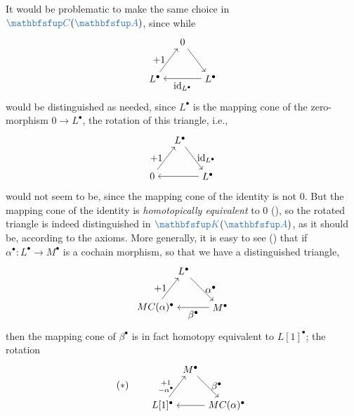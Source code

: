 It would be problematic to make the same choice in
$\categ{C}(\categ{A})$, since while
\[
  \begin{tikzpicture}[baseline=(current bounding box.center)]
    \node (T) at (1,1.3) {$0$}; \node (Z) at (0,0)
    {$L^\bullet$}; \node (B) at (2,0)
    {$L^\bullet$}; \draw[->] (T) -- (B); \draw[->] (B) -- (Z)
    node[midway, below]
    {$\id_{L^\bullet}$}; \draw[->] (Z) -- (T) node[midway, left]
    {$+1$};
  \end{tikzpicture}
\]
would be distinguished as needed, since $L^\bullet$ is the mapping
cone of the zero-morphism $0 \to L^\bullet$, the rotation of this
triangle, i.e.,
\[
  \begin{tikzpicture}[baseline=(current bounding box.center)]
    \node (L) at (1,1.3) {$L^\bullet$}; \node (Z) at (0,0)
    {$0$}; \node (B) at (2,0)
    {$L^\bullet$}; \draw[->] (L) -- (B) node[midway, right]
    {$\id_{L^\bullet}$}; \draw[->] (B) -- (Z); \draw[->] (Z) -- (L)
    node[midway, left] {$+1$};
  \end{tikzpicture}
\]
would not seem to be, since the mapping cone of the identity is not
$0$. But the mapping cone of the identity is \emph{homotopically
  equivalent} to $0$
(),
so the rotated triangle is indeed distinguished in
$\categ{K}(\categ{A})$, as it should be, according to the axioms. More
generally, it is easy to see
()
that if $\alpha^\bullet : L^\bullet \to M^\bullet$ is a cochain
morphism, so that we have a distinguished triangle,
\[
  \begin{tikzpicture}[baseline=(current bounding box.center)]
    \node (L) at (1,1.3)
    {$L^\bullet$}; \node (MC) at (0,0)
    {$MC(\alpha)^\bullet$}; \node (M) at (2.3,0)
    {$M^\bullet$}; \draw[->] (L) -- (M) node[midway, right]
    {$\alpha^\bullet$}; \draw[->] (M) -- (MC) node[midway, below]
    {$\beta^\bullet$}; \draw[->] (MC) -- (L) node[midway, left]
    {$+1$};
  \end{tikzpicture}
\]
then the mapping cone of $\beta^\bullet$ is in fact homotopy
equivalent to $L[1]^\bullet$; the rotation
\[
  (*) \qquad
  \begin{tikzpicture}[baseline=(current bounding box.center)]
    \node (M) at (1,1.3)
    {$M^\bullet$}; \node (L1) at (0,0)
    {$L[1]^\bullet$}; \node (MC) at (2.3,0)
    {$MC(\alpha)^\bullet$}; \draw[->] (M) -- (MC) node[midway, right]
    {$\beta^\bullet$}; \draw[->] (MC) -- (L1); \draw[->] (L1) -- (M)
    node[midway, left] {$\substack{+1\\-\alpha^\bullet}$};
  \end{tikzpicture}
\]
